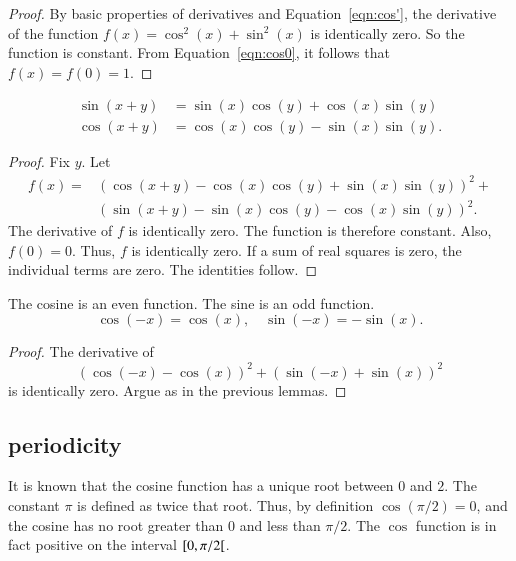 \begin{proof}
By basic properties of derivatives and Equation~\ref{eqn:cos'},
the derivative of the function $f(x) = \cos^2(x) +\sin^2(x)$ is
identically zero.   So the function is constant.  From
Equation~\ref{eqn:cos0}, it follows that $f(x)=f(0)=1$.
\end{proof}

\begin{lemma}\label{lemma:sin-add}
  $$\begin{array}{lll}
  \sin(x+y) &= \sin(x)\cos(y) + \cos(x)\sin(y)\\
  \cos(x+y)  &= \cos(x)\cos(y) - \sin(x)\sin(y).
  \end{array}$$
\end{lemma}

\begin{proof}
Fix $y$.  Let
    $$\begin{array}{lll}
    f(x) = &(\cos(x+y) - \cos(x)\cos(y) +
    \sin(x)\sin(y))^2 +\\ & (\sin(x+y) -\sin(x)\cos(y) -
    \cos(x)\sin(y))^2.
    \end{array}$$
The derivative of $f$ is identically zero.  The function is
therefore constant. Also, $f(0)=0$.  Thus, $f$ is identically zero.
If a sum of real squares is zero, the individual terms are zero. The
identities follow.
\end{proof}

\begin{lemma}\label{lemma:cos-neg}
The cosine is an even function.  The sine is an odd
function.
    $$\cos(-x) = \cos(x),\quad\sin(-x) = -\sin(x).$$
\end{lemma}

\begin{proof}
The derivative of
    $$(\cos(-x) - \cos(x))^2 + (\sin(-x) +\sin(x))^2$$
is identically zero.  Argue as in the previous lemmas.
\end{proof}

\subsection{periodicity}
\label{sec:pi}

It is known that the cosine function has a unique root between $0$
and $2$. The constant $\pi$ is defined as twice that root.  Thus, by
definition $\cos(\pi/2) = 0$, and the cosine has no root greater
than $0$ and less than $\pi/2$. The $\cos$ function is in fact
positive on the interval $[ 0,\pi/2[$.


